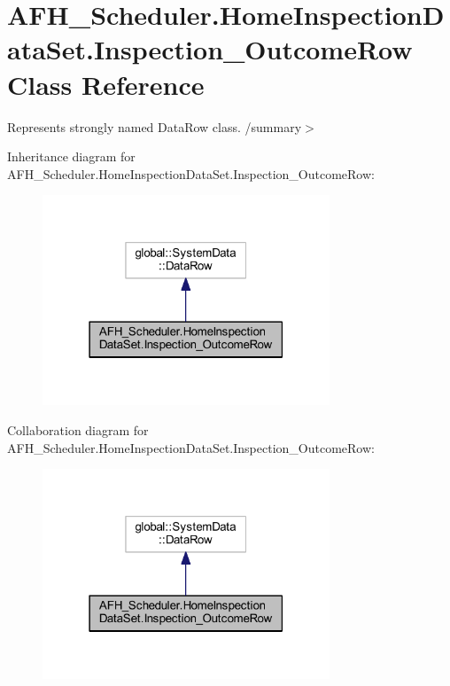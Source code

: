 \section{A\+F\+H\+\_\+\+Scheduler.\+Home\+Inspection\+Data\+Set.\+Inspection\+\_\+\+Outcome\+Row Class Reference}
\label{class_a_f_h___scheduler_1_1_home_inspection_data_set_1_1_inspection___outcome_row}


Represents strongly named Data\+Row class. /summary$>$  




Inheritance diagram for A\+F\+H\+\_\+\+Scheduler.\+Home\+Inspection\+Data\+Set.\+Inspection\+\_\+\+Outcome\+Row\+:
\nopagebreak
\begin{figure}[H]
\begin{center}
\leavevmode
\includegraphics[width=243pt]{class_a_f_h___scheduler_1_1_home_inspection_data_set_1_1_inspection___outcome_row__inherit__graph}
\end{center}
\end{figure}


Collaboration diagram for A\+F\+H\+\_\+\+Scheduler.\+Home\+Inspection\+Data\+Set.\+Inspection\+\_\+\+Outcome\+Row\+:
\nopagebreak
\begin{figure}[H]
\begin{center}
\leavevmode
\includegraphics[width=243pt]{class_a_f_h___scheduler_1_1_home_inspection_data_set_1_1_inspection___outcome_row__coll__graph}
\end{center}
\end{figure}
